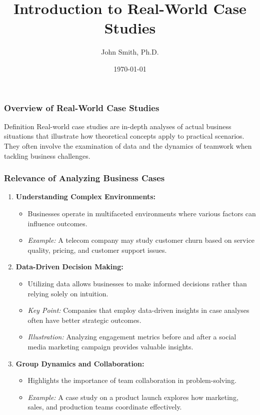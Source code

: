 \documentclass[aspectratio=169]{beamer}
\begin{document}
\frame{\titlepage}

\begin{frame}[fragile]
    \title{Introduction to Real-World Case Studies}
    \author{John Smith, Ph.D.}
    \date{\today}
    \maketitle
\end{frame}

\begin{frame}[fragile]
    \frametitle{Overview of Real-World Case Studies}
    \begin{block}{Definition}
        Real-world case studies are in-depth analyses of actual business situations that illustrate how theoretical concepts apply to practical scenarios. They often involve the examination of data and the dynamics of teamwork when tackling business challenges.
    \end{block}
\end{frame}

\begin{frame}[fragile]
    \frametitle{Relevance of Analyzing Business Cases}
    \begin{enumerate}
        \item \textbf{Understanding Complex Environments:}
        \begin{itemize}
            \item Businesses operate in multifaceted environments where various factors can influence outcomes.
            \item \textit{Example:} A telecom company may study customer churn based on service quality, pricing, and customer support issues.
        \end{itemize}
        
        \item \textbf{Data-Driven Decision Making:}
        \begin{itemize}
            \item Utilizing data allows businesses to make informed decisions rather than relying solely on intuition.
            \item \textit{Key Point:} Companies that employ data-driven insights in case analyses often have better strategic outcomes.
            \item \textit{Illustration:} Analyzing engagement metrics before and after a social media marketing campaign provides valuable insights.
        \end{itemize}
        
        \item \textbf{Group Dynamics and Collaboration:}
        \begin{itemize}
            \item Highlights the importance of team collaboration in problem-solving.
            \item \textit{Example:} A case study on a product launch explores how marketing, sales, and production teams coordinate effectively.
        \end{itemize}
    \end{enumerate}
\end{frame}
\end{document}
